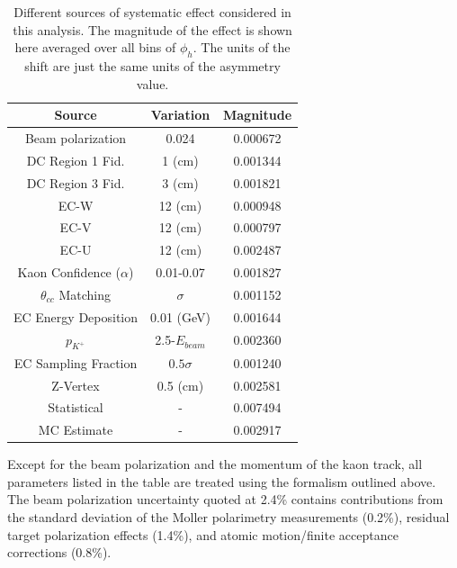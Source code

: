 \begin{table}
  \centering
  \begin{tabular}{c|c|c}
    Source                     & Variation & Magnitude \\ 
    \hline
    Beam polarization          & 0.024          & 0.000672 \\ 
    DC Region 1 Fid.           & 1 (cm)         & 0.001344 \\ 
    DC Region 3 Fid.           & 3 (cm)         & 0.001821 \\
    EC-W                       & 12 (cm)        & 0.000948 \\ 
    EC-V                       & 12 (cm)        & 0.000797 \\
    EC-U                       & 12 (cm)        & 0.002487 \\
    Kaon Confidence ($\alpha$) & 0.01-0.07      & 0.001827 \\
    $\theta_{cc}$ Matching     & $\sigma$       & 0.001152 \\
    EC Energy Deposition       & 0.01 (GeV)     & 0.001644 \\
    $p_{K^+}$                  & 2.5-$E_{beam}$ & 0.002360 \\ 
    EC Sampling Fraction       & $0.5 \sigma$   & 0.001240 \\
    Z-Vertex                   & 0.5 (cm)       & 0.002581 \\
    \hline 
    Statistical                & -              & 0.007494 \\ 
    \hline
    MC Estimate                & -              & 0.002917
  \end{tabular}
  \caption{Different sources of systematic effect considered in this analysis.  The magnitude of the effect is shown here averaged over all bins of $\phi_h$.  The units of the shift are just the same units of the asymmetry value. }
  \label{table:kaon-systematics}
\end{table}

Except for the beam polarization and the momentum of the kaon track, all parameters listed in the table are treated using the formalism outlined above.  The beam polarization uncertainty quoted at 2.4\% contains contributions from the standard deviation of the Moller polarimetry measurements (0.2\%), residual target polarization effects (1.4\%), and atomic motion/finite acceptance corrections (0.8\%).\\

